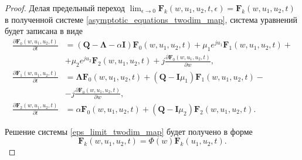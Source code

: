 \begin{proof}
	Делая предельный переход $ \lim_{\epsilon \xrightarrow{} 0}\boldsymbol{F}_{k}(w,u_{1},u_{2},t,\epsilon) = \boldsymbol{F}_{k}(w,u_{1},u_{2},t)$  в полученной системе \eqref{asymptotic_equations_twodim_map}, система уравнений будет записана в виде
	\begin{equation} \label{eps_limit_twodim_map}
		\begin{split}
			\frac{{\partial \boldsymbol{F}_{0}(w,u_{1},u_{2},t)}}{{\partial t}} &= (\boldsymbol{Q}-\boldsymbol{\Lambda}-\alpha\boldsymbol{I})\boldsymbol{F}_{0}(w,u_{1},u_{2},t) + \mu_{1} e^{ju_{1}}\boldsymbol{F}_{1}(w,u_{1},u_{2},t)  + \\  &+ \mu_{2}e^{ju_{2}}\boldsymbol{F}_{2}(w,u_{1},u_{2},t) + j
			\frac{{\partial \boldsymbol{F}_{0}(w,u_{1},u_{2},t)}}{{\partial w}},
			\\
			\frac{{\partial \boldsymbol{F}_{1}(w,u_{1},u_{2},t)}}{{\partial t}} &= \boldsymbol{\Lambda} \boldsymbol{F}_{0}(w,u_{1},u_{2},t) +  (\boldsymbol{Q} - \boldsymbol{I}\mu_{1})\boldsymbol{F}_{1}(w,u_{1},u_{2},t) -\\ &- j
			\frac{{\partial \boldsymbol{F}_{0}(w,u_{1},u_{2},t)}}{{\partial w}},
			\\
			\frac{{\partial \boldsymbol{F}_{2}(w,u_{1},u_{2},t)}}{{\partial t}} &= \alpha \boldsymbol{F}_{0}(w,u_{1},u_{2},t) + (\boldsymbol{Q} - \boldsymbol{I}\mu_{2})\boldsymbol{F}_{2}(w,u_{1},u_{2},t).
		\end{split}
	\end{equation}   

	Решение системы \eqref{eps_limit_twodim_map} будет получено в форме
	\begin{equation} \label{solution_twodim_map}
		\boldsymbol{F}_{k}(w,u_{1},u_{2},t) = \Phi(w)\boldsymbol{F}_{k}(u_{1},u_{2},t).
	\end{equation}  


\end{proof}
